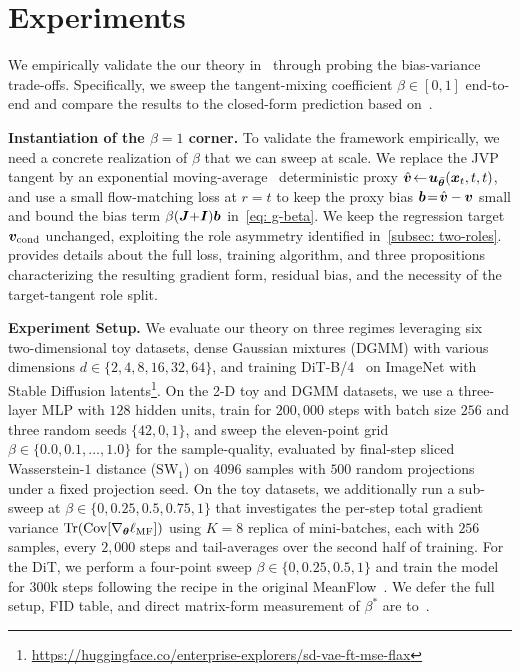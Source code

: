 \section{Experiments}
\label{sec: experiment}

We empirically validate the our theory in~ through probing the bias-variance trade-offs. Specifically, we sweep the tangent-mixing coefficient $\beta\!\in\![0,1]$ end-to-end and compare the results to the closed-form prediction based on~.

\noindent\textbf{Instantiation of the $\beta\!=\!1$ corner.}
To validate the framework empirically, we need a concrete realization of $\beta$ that we can sweep at scale. We replace the JVP tangent by an exponential moving-average~\cite{polyak1992acceleration} deterministic proxy $\hat{{\bm{v}}}\!\gets\!{\bm{u}}_{\bar{{\bm{\theta}}}}({\bm{x}}_{t},t,t)$, and use a small flow-matching loss at $r\!=\!t$ to keep the proxy bias ${\bm{b}}\!=\!\hat{{\bm{v}}}-{\bm{v}}$ small and bound the bias term $\beta({\bm{J}}{+}{\bm{I}}){\bm{b}}$ in~\eqref{eq: g-beta}. We keep the regression target ${\bm{v}}_{\text{cond}}$ unchanged, exploiting the role asymmetry identified in~\cref{subsec: two-roles}.  provides details about the full loss, training algorithm, and three propositions characterizing the resulting gradient form, residual bias, and the necessity of the target-tangent role split.

\noindent\textbf{Experiment Setup.} We evaluate our theory on three regimes leveraging six two-dimensional toy datasets, dense Gaussian mixtures (DGMM) with various dimensions $d\!\in\!\{2,4,8,16,32,64\}$, and training DiT-B/4~\cite{peebles2023scalablediffusion} on ImageNet with Stable Diffusion latents\footnote{\url{https://huggingface.co/enterprise-explorers/sd-vae-ft-mse-flax}}. On the 2-D toy and DGMM datasets, we use a three-layer MLP with $128$ hidden units, train for $200{,}000$ steps with batch size $256$ and three random seeds $\{42, 0, 1\}$, and sweep the eleven-point grid $\beta\!\in\!\{0.0,0.1,\dots,1.0\}$ for the sample-quality, evaluated by final-step sliced Wasserstein-$1$ distance ($\mathrm{SW}_1$) on $4096$ samples with $500$ random projections under a fixed projection seed. On the toy datasets, we additionally run a sub-sweep at $\beta\!\in\!\{0,0.25,0.5,0.75,1\}$ that investigates the per-step total gradient variance $\operatorname{Tr}(\mathrm{Cov}[\nabla_{{\bm{\theta}}}\ell_{\text{MF}}])$ using $K\!=\!8$ replica of mini-batches, each with $256$ samples, every $2{,}000$ steps and tail-averages over the second half of training. For the DiT, we perform a four-point sweep $\beta\!\in\!\{0,0.25,0.5,1\}$ and train the model for $300$k steps following the recipe in the original MeanFlow~\cite{geng2025meanflowsonestepgenerative}. We defer the full setup, FID table, and direct matrix-form measurement of $\beta^{\ast}$ are to~.


